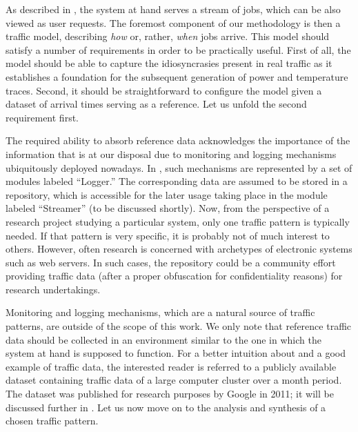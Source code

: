 \raggedbottom
As described in , the system at hand serves a stream
of jobs, which can be also viewed as user requests. The foremost component of
our methodology is then a traffic model, describing \emph{how} or, rather,
\emph{when} jobs arrive. This model should satisfy a number of requirements in
order to be practically useful. First of all, the model should be able to
capture the idiosyncrasies present in real traffic as it establishes a
foundation for the subsequent generation of power and temperature traces.
Second, it should be straightforward to configure the model given a dataset of
arrival times serving as a reference. Let us unfold the second requirement
first.

The required ability to absorb reference data acknowledges the importance of the
information that is at our disposal due to monitoring and logging mechanisms
ubiquitously deployed nowadays. In , such mechanisms are
represented by a set of modules labeled ``Logger.'' The corresponding data are
assumed to be stored in a repository, which is accessible for the later usage
taking place in the module labeled ``Streamer'' (to be discussed shortly). Now,
from the perspective of a research project studying a particular system, only
one traffic pattern is typically needed. If that pattern is very specific, it is
probably not of much interest to others. However, often research is concerned
with archetypes of electronic systems such as web servers. In such cases, the
repository could be a community effort providing traffic data (after a proper
obfuscation for confidentiality reasons) for research undertakings.

Monitoring and logging mechanisms, which are a natural source of traffic
patterns, are outside of the scope of this work. We only note that reference
traffic data should be collected in an environment similar to the one in which
the system at hand is supposed to function. For a better intuition about and a
good example of traffic data, the interested reader is referred to a publicly
available dataset \cite{google} containing traffic data of a large computer
cluster over a month period. The dataset was published for research purposes by
Google in 2011; it will be discussed further in . Let us
now move on to the analysis and synthesis of a chosen traffic pattern.
\makeatletter
\afterpage{\global\let\@textbottom\relax \global\let\@texttop\relax}


